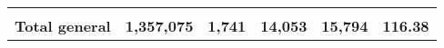 \begin{tabular}{lrcclr}
	& \multicolumn{1}{l}{}                                           & \multicolumn{1}{l}{}                                       & \multicolumn{1}{l}{} &                                                                     & \multicolumn{1}{l}{}                                                         \\
	\rowcolor[HTML]{DDEBF7} 
	\textbf{Total   general}                                       & \textbf{1,357,075}                                             & \multicolumn{1}{r}{\cellcolor[HTML]{DDEBF7}\textbf{1,741}} & \textbf{14,053}      & \textbf{15,794}                                                     & \textbf{116.38}                                                             
\end{tabular}
